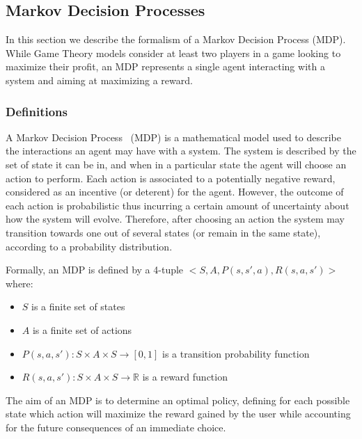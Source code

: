 \newpage
\subsection{Markov Decision Processes}
In this section we describe the formalism of a Markov Decision Process (MDP).
While Game Theory models consider at least two players in a game looking to maximize their profit, an MDP represents a single agent interacting with a system and aiming at maximizing a reward. 

\subsubsection{Definitions}
A Markov Decision Process~\cite{bellman1957} (MDP) is a mathematical model used to describe the interactions  an agent may have with a system.
The system is described by the set of state it can be in, and when in a particular state the agent will choose an action to perform.
Each action is associated to a potentially negative reward, considered as an incentive (or deterent) for the agent.
However, the outcome of each action is probabilistic thus incurring a certain amount of uncertainty about how the system will evolve.
Therefore, after choosing an action the system may transition towards one out of several states (or remain in the same state), according to a probability distribution.


Formally, an MDP is defined by a 4-tuple $<S,A,P(s,s',a),R(s,a,s')>$ where:
\begin{itemize}
    \item $S$ is a finite set of states
    \item $A$ is a finite set of actions
    \item $P(s,a,s') : S \times A \times S \longrightarrow [0,1]$ is a transition probability function
    \item $R(s,a,s') : S \times A \times S \longrightarrow \mathbb{R}$ is a reward function
\end{itemize}

The aim of an MDP is to determine an optimal policy, defining for each possible state which action will maximize the reward gained by the user while accounting for the future consequences of an immediate choice.

